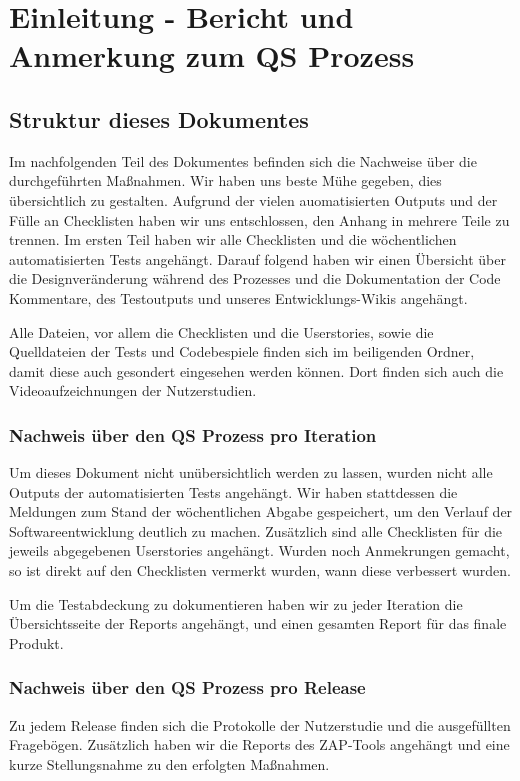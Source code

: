 \documentclass[accentcolor=tud0b,12pt,paper=a4]{tudreport}
\begin{document}
\chapter{Einleitung - Bericht und Anmerkung zum QS Prozess}
\section{Struktur dieses Dokumentes}
Im nachfolgenden Teil des Dokumentes befinden sich die Nachweise über die durchgeführten Maßnahmen. Wir haben uns beste Mühe gegeben, dies übersichtlich zu gestalten. Aufgrund der vielen auomatisierten Outputs und der Fülle an Checklisten haben wir uns entschlossen, den Anhang in mehrere Teile zu trennen. Im ersten Teil haben wir alle Checklisten und die wöchentlichen automatisierten Tests angehängt. Darauf folgend haben wir einen Übersicht über die Designveränderung während des Prozesses und die Dokumentation der Code Kommentare, des Testoutputs und unseres Entwicklungs-Wikis angehängt.

Alle Dateien, vor allem die Checklisten und die Userstories, sowie die Quelldateien der Tests und Codebespiele finden sich im beiligenden Ordner, damit diese auch gesondert eingesehen werden können. Dort finden sich auch die Videoaufzeichnungen der Nutzerstudien.

\subsection{Nachweis über den QS Prozess pro Iteration}
Um dieses Dokument nicht unübersichtlich werden zu lassen, wurden nicht alle Outputs der automatisierten Tests angehängt. Wir haben stattdessen die Meldungen zum Stand der wöchentlichen Abgabe gespeichert, um den Verlauf der Softwareentwicklung deutlich zu machen. Zusätzlich sind alle Checklisten für die jeweils abgegebenen Userstories angehängt. Wurden noch Anmekrungen gemacht, so ist direkt auf den Checklisten vermerkt wurden, wann diese verbessert wurden.

Um die Testabdeckung zu dokumentieren haben wir zu jeder Iteration die Übersichtsseite der Reports angehängt, und einen gesamten Report für das finale Produkt.

\subsection{Nachweis über den QS Prozess pro Release}
Zu jedem Release finden sich die Protokolle der Nutzerstudie und die ausgefüllten Fragebögen. Zusätzlich haben wir die Reports des ZAP-Tools angehängt und eine kurze Stellungsnahme zu den erfolgten Maßnahmen.
\end{document}
